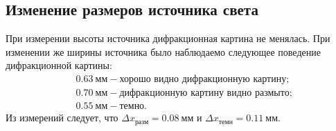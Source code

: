 \documentclass[12pt]{article}
\begin{document}
	\subsection{Изменение размеров источника света}
	При измерении высоты источника дифракционная картина не менялась. При изменении же ширины источника было наблюдаемо следующее поведение дифракционной картины:
	\begin{equation*}
	\begin{split}
		&0.63\ \text{мм} - \text{хорошо видно дифракционную картину;}\\
		&0.70\ \text{мм} - \text{дифракционную картину видно размыто;}\\
		&0.55\ \text{мм} - \text{темно.}
	\end{split}
	\end{equation*}
	Из измерений следует, что $\Delta x_\text{разм} = 0.08\ \text{мм}$ и $\Delta x_\text{темн} = 0.11\ \text{мм}$.	
\end{document}
